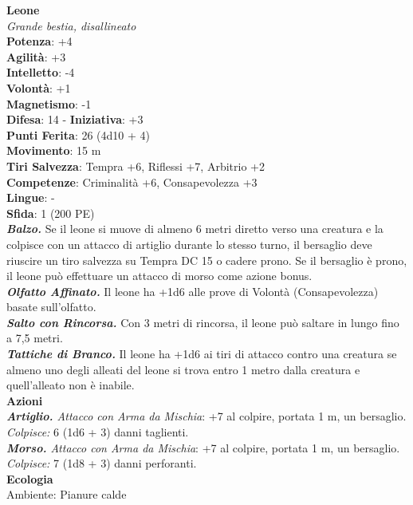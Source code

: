 \begin{multicols}{2}
\medskip\textbf{Leone}\\
\emph{Grande bestia, disallineato}\\
\textbf{Potenza}: +4\\
\textbf{Agilità}: +3\\
\textbf{Intelletto}: -4\\
\textbf{Volontà}: +1\\
\textbf{Magnetismo}: -1\\
\textbf{Difesa}: 14 - \textbf{Iniziativa}: +3\\
\textbf{Punti Ferita}: 26 (4d10 + 4)\\
\textbf{Movimento}: 15 m\\
\textbf{Tiri Salvezza}: Tempra +6, Riflessi +7, Arbitrio +2 \\
\textbf{Competenze}: Criminalità +6, Consapevolezza +3\\
\textbf{Lingue}: -\\
\textbf{Sfida}: 1 (200 PE)\smallskip\\
\emph{\textbf{Balzo.}} Se il leone si muove di almeno 6 metri diretto verso una creatura e la colpisce con un attacco di artiglio durante lo stesso turno, il bersaglio deve riuscire un tiro salvezza su Tempra DC  15 o cadere prono. Se il bersaglio è prono, il leone può effettuare un attacco di morso come azione bonus.\\
\emph{\textbf{Olfatto Affinato.}} Il leone ha +1d6 alle prove di Volontà (Consapevolezza) basate sull'olfatto.\\
\emph{\textbf{Salto con Rincorsa.}} Con 3 metri di rincorsa, il leone può saltare in lungo fino a 7,5 metri.\\
\emph{\textbf{Tattiche di Branco.}} Il leone ha +1d6 ai tiri di attacco contro una creatura se almeno uno degli alleati del leone si trova entro 1 metro dalla creatura e quell'alleato non è inabile.\\
\smallskip\textbf{Azioni}\\
\emph{\textbf{Artiglio.} Attacco con Arma da Mischia}: +7 al colpire, portata 1 m, un bersaglio.\\
\emph{Colpisce:} 6 (1d6 + 3) danni taglienti.\\
\emph{\textbf{Morso.} Attacco con Arma da Mischia}: +7 al colpire, portata 1 m, un bersaglio.\\
\emph{Colpisce:} 7 (1d8 + 3) danni perforanti.\\
\textbf{Ecologia}\\
Ambiente: Pianure calde\\

\end{multicols}
